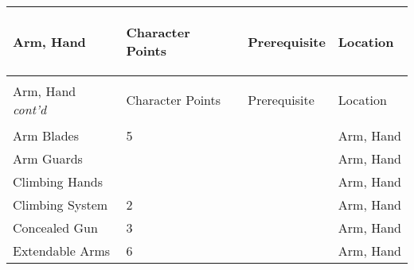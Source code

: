 \documentclass[twoside]{book}
\begin{document}
\begin{longtable}{p{1.25in}p{2em}ll} 
  Arm, Hand
  &
  \begin{turn}{70}{Character Points}\end{turn}
          
  &
  \begin{turn}{70}{Prerequisite}\end{turn}
          
  &
  \begin{turn}{70}{Location}\end{turn}
          
  \\
  \hline
  \hline
  \endfirsthead
  Arm, Hand \textit{cont'd}
        
  &
  \begin{turn}{70}{Character Points}\end{turn}
          
  &
  \begin{turn}{70}{Prerequisite}\end{turn}
          
  &
  \begin{turn}{70}{Location}\end{turn}
          
  \\
  \endhead
      
  \raggedright
           Arm Blades 
  &
   5 
  &
  
  &
   Arm, Hand 
  \tabularnewline
  \hline
      
  \raggedright
           Arm Guards 
  &
  
  &
  
  &
   Arm, Hand 
  \tabularnewline
  \hline
      
  \raggedright
           Climbing Hands 
  &
  
  &
  
  &
   Arm, Hand 
  \tabularnewline
  \hline
      
  \raggedright
           Climbing System 
  &
   2 
  &
  
  &
   Arm, Hand 
  \tabularnewline
  \hline
      
  \raggedright
           Concealed Gun 
  &
   3 
  &
  
  &
   Arm, Hand 
  \tabularnewline
  \hline
      
  \raggedright
           Extendable Arms 
  &
   6 
  &
  
  &
   Arm, Hand 
  \tabularnewline
  \hline
      

\end{longtable}
\end{document}
